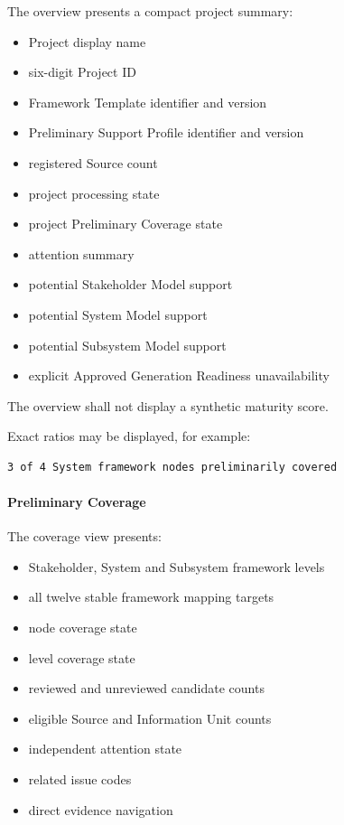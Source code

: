 The overview presents a compact project summary:

\begin{itemize}
\tightlist
\item
  Project display name
\item
  six-digit Project ID
\item
  Framework Template identifier and version
\item
  Preliminary Support Profile identifier and version
\item
  registered Source count
\item
  project processing state
\item
  project Preliminary Coverage state
\item
  attention summary
\item
  potential Stakeholder Model support
\item
  potential System Model support
\item
  potential Subsystem Model support
\item
  explicit Approved Generation Readiness unavailability
\end{itemize}

The overview shall not display a synthetic maturity score.

Exact ratios may be displayed, for example:

\begin{verbatim}
3 of 4 System framework nodes preliminarily covered
\end{verbatim}

\hypertarget{preliminary-coverage}{%
\paragraph{Preliminary Coverage}\label{preliminary-coverage}}

The coverage view presents:

\begin{itemize}
\tightlist
\item
  Stakeholder, System and Subsystem framework levels
\item
  all twelve stable framework mapping targets
\item
  node coverage state
\item
  level coverage state
\item
  reviewed and unreviewed candidate counts
\item
  eligible Source and Information Unit counts
\item
  independent attention state
\item
  related issue codes
\item
  direct evidence navigation
\end{itemize}

